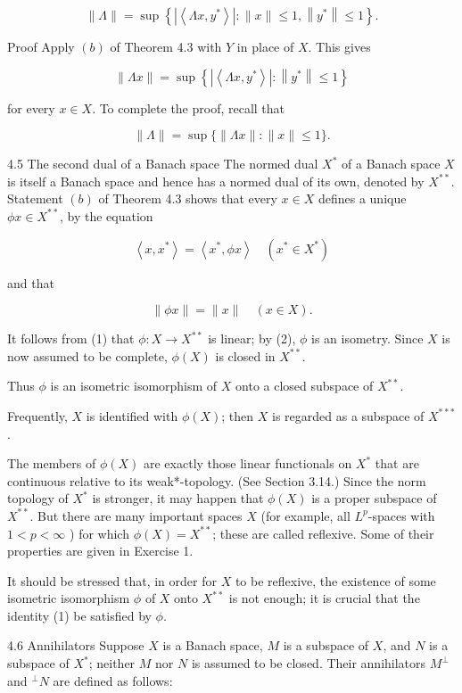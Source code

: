 \documentclass[10pt]{article}
\begin{document}
$$
\|\Lambda\|=\sup \left\{\left|\left\langle\Lambda x, y^{*}\right\rangle\right|:\|x\| \leq 1,\left\|y^{*}\right\| \leq 1\right\} .
$$

Proof Apply $(b)$ of Theorem 4.3 with $Y$ in place of $X$. This gives

$$
\|\Lambda x\|=\sup \left\{\left|\left\langle\Lambda x, y^{*}\right\rangle\right|:\left\|y^{*}\right\| \leq 1\right\}
$$

for every $x \in X$. To complete the proof, recall that

$$
\|\Lambda\|=\sup \{\|\Lambda x\|:\|x\| \leq 1\} .
$$

4.5 The second dual of a Banach space The normed dual $X^{*}$ of a Banach space $X$ is itself a Banach space and hence has a normed dual of its own, denoted by $X^{* *}$. Statement $(b)$ of Theorem 4.3 shows that every $x \in X$ defines a unique $\phi x \in X^{* *}$, by the equation

$$
\left\langle x, x^{*}\right\rangle=\left\langle x^{*}, \phi x\right\rangle \quad\left(x^{*} \in X^{*}\right)
$$

and that

$$
\|\phi x\|=\|x\| \quad(x \in X) .
$$

It follows from (1) that $\phi: X \rightarrow X^{* *}$ is linear; by (2), $\phi$ is an isometry. Since $X$ is now assumed to be complete, $\phi(X)$ is closed in $X^{* *}$.

Thus $\phi$ is an isometric isomorphism of $X$ onto a closed subspace of $X^{* *}$.

Frequently, $X$ is identified with $\phi(X)$; then $X$ is regarded as a subspace of $X^{* * *}$.

The members of $\phi(X)$ are exactly those linear functionals on $X^{*}$ that are continuous relative to its weak*-topology. (See Section 3.14.) Since the norm topology of $X^{*}$ is stronger, it may happen that $\phi(X)$ is a proper subspace of $X^{* *}$. But there are many important spaces $X$ (for example, all $L^{p}$-spaces with $1<p<\infty$ ) for which $\phi(X)=X^{* *}$; these are called reflexive. Some of their properties are given in Exercise 1.

It should be stressed that, in order for $X$ to be reflexive, the existence of some isometric isomorphism $\phi$ of $X$ onto $X^{* *}$ is not enough; it is crucial that the identity (1) be satisfied by $\phi$.

4.6 Annihilators Suppose $X$ is a Banach space, $M$ is a subspace of $X$, and $N$ is a subspace of $X^{*}$; neither $M$ nor $N$ is assumed to be closed. Their annihilators $M^{\perp}$ and ${ }^{\perp} N$ are defined as follows:
\end{document}

